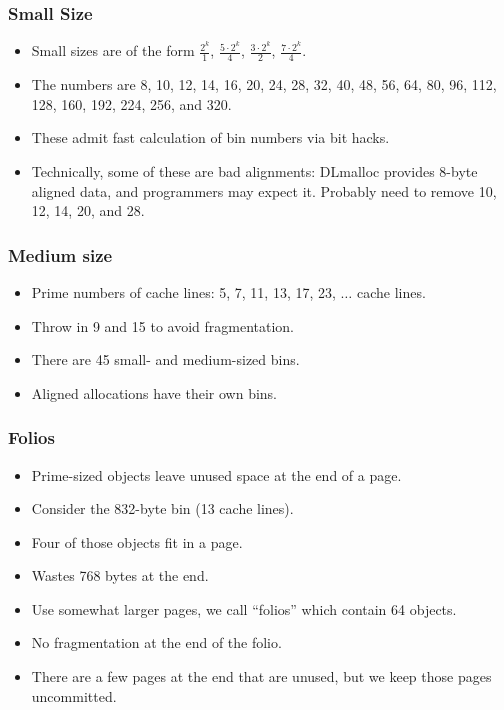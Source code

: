 \documentclass[xcolor=dvipsnames,14pt]{beamer}
\newcommand{\smmpunt}[1]{#1}
\begin{document}
\smmpunt{
\begin{frame}
\frametitle{Small Size}

\begin{itemize}
\item Small sizes are of the form $\frac{2^k}{1}$, $\frac{5 \cdot 2^k}{4}$, $\frac{3 \cdot 2^k}{2}$, $\frac{7 \cdot 2^k}{4}$.  
\item The numbers are 8, 10, 12, 14, 16, 20, 24, 28, 32, 40, 48, 56, 64, 80, 96, 112, 128, 160, 192, 224, 256, and 320.
\item These admit fast calculation of bin numbers via bit hacks.
\item Technically, some of these are bad alignments:  DLmalloc provides 8-byte aligned data, and programmers may expect it.  Probably need to remove 10, 12, 14, 20, and 28.
\end{itemize}
\end{frame}
}

\smmpunt{
\begin{frame}
\frametitle{Medium size}
\begin{itemize}
\item Prime numbers of cache lines: 5, 7, 11, 13, 17, 23,
  $\ldots$ cache lines.

\item Throw in 9 and 15 to avoid fragmentation.

\item There are 45 small- and medium-sized bins.
\item Aligned allocations have their own bins.
\end{itemize}
\end{frame}
}

\smmpunt{
\begin{frame}
\frametitle{Folios}

\begin{itemize}
\item Prime-sized objects leave unused space at the end of a page.

\item Consider the 832-byte bin (13 cache lines). 

\item Four of those objects fit in a page.
\item Wastes 768 bytes at the end.
\item Use somewhat larger pages, we call ``folios'' which contain 64 objects.
\item No fragmentation at the end of the folio.
\item There are a few pages at the end that are unused, but we keep those pages uncommitted.
\end{itemize}
\end{frame}
}
\end{document}
